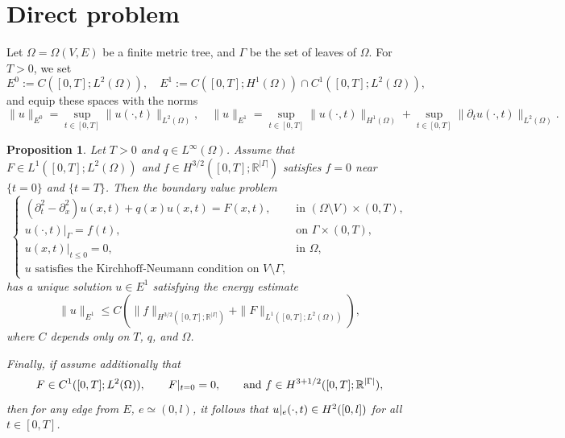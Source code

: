 \documentclass[11pt]{amsart}
\newcommand{\HOX}[1]{\marginpar{\footnotesize #1}}
\theoremstyle{definition}
\theoremstyle{plain}
\newtheorem{proposition}[definition]{Proposition}
\numberwithin{equation}{section}
\begin{document}
\section{Direct problem} \label{direct}
Let $\Omega=\Omega(V,E)$ be a finite metric tree, and $\Gamma$ be the set of leaves of $\Omega$. 
For $T>0$, we set 
\begin{equation*}
    E^0 := C([0,T]; L^2(\Omega)),
    \quad
    E^1 := C([0,T]; H^1(\Omega)) \cap C^1([0,T]; L^2(\Omega)),
\end{equation*}
and equip these spaces with the norms 
\begin{equation*}
    \|u\|_{E^0} = \sup_{t\in [0,T]} \|u(\cdot, t)\|_{L^2(\Omega)},
    \quad
    \|u\|_{E^1} = \sup_{t\in [0,T]} \|u(\cdot, t)\|_{H^1(\Omega)} + \sup_{t\in [0,T]} \|\partial_t u(\cdot, t)\|_{L^2(\Omega)}.
\end{equation*}



\begin{proposition}\label{Prop_linear_energy_est} 
Let $T>0$ and $q\in L^\infty(\Omega)$. Assume that $F\in L^1([0,T]; L^2(\Omega))$ and $f \in H^{3/2}([0,T]; \mathbb{R}^{|\Gamma|})$ satisfies $f = 0$ near $\{t=0\}$ and $\{t=T\}$. Then the boundary value problem 
\begin{equation}\label{lin_eq} 
\begin{cases} 
    (\partial_{t}^2 -\partial_x^2 ) u(x,t)+q(x) u(x,t)=F(x,t), &\text{in }(\Omega\setminus V)\times (0,T),\\ 
    u(\cdot,t)|_{\Gamma}=f(t), & \text{on } \Gamma\times(0,T),\\ 
    u(x,t)|_{t \leq 0}=0, & \text{in } \Omega,\\ 
    u \textrm{ satisfies the Kirchhoff-Neumann condition on } V\setminus\Gamma,
\end{cases} 
\end{equation} has a unique solution $u \in E^1$ satisfying the energy estimate
\begin{equation}\label{est_energy_linear_case}
    \|u\|_{E^1} \leq C\left(\|f\|_{H^{3/2}([0,T]; \mathbb{R}^{|\Gamma|})} + \|F\|_{L^1([0,T]; L^2(\Omega))}\right),
\end{equation}
where $C$ depends only on $T$, $q$, and $\Omega$.

Finally, if assume additionally that 
\begin{equation}\label{add_assumptions}
    F\in C^1([0,T]; L^2(\Omega)),
    \qquad
    F\arrowvert_{t=0}=0,
    \qquad
    \text{and }
    f \in H^{3 + 1/2}([0,T]; \mathbb{R}^{|\Gamma|}),
\end{equation}
then for any edge from $E$, $e\simeq(0,l)$, it follows that $u\arrowvert_{e}(\cdot, t) \in H^2([0,l])$ for all $t\in [0,T]$.
\end{proposition}
\end{document}
